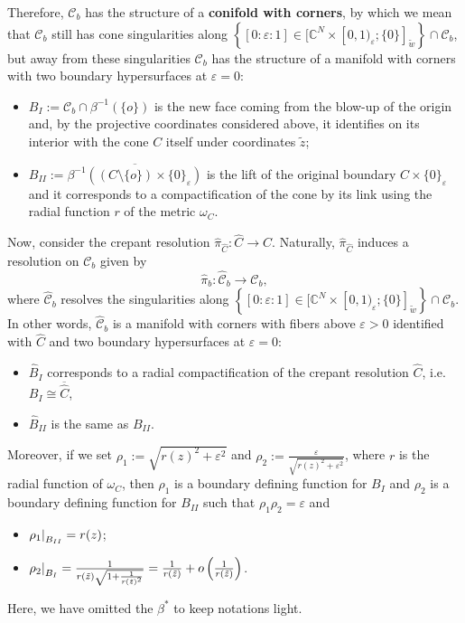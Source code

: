 \documentclass[a4paper,11pt]{article}
\def\C{\mathbb{C}}
\newcommand\restr[2]{{%
  \left.\kern-\nulldelimiterspace %
  #1 %
  \littletaller %
  \right|_{#2} %
  }}
\newcommand{\littletaller}{\mathchoice{\vphantom{\big|}}{}{}{}}
\begin{document}
Therefore, $\mathcal{C}_b$ has the structure of a \textbf{conifold with corners}, by which we mean that $\mathcal{C}_b$ still has cone singularities along $\left\{ [ 0 : \varepsilon :1] \in[\C^N \times [0,1)_\varepsilon ; \{0\}]_{\tilde w} \right\} \cap \mathcal{C}_b$, but away from these singularities $\mathcal{C}_b$ has the structure of a manifold with corners with two boundary hypersurfaces at $\varepsilon=0$: 
\begin{itemize}
    \item 
$B_I:= \mathcal{C}_b \cap \beta^{-1} ( \{ o\})$ is the new face coming from the blow-up of the origin and, by the projective coordinates considered above, it identifies on its interior with the cone $C$ itself under coordinates $\tilde z$;
\item $B_{II} := \overline{\beta^{-1}((C \setminus \{ o\}) \times \{ 0\}_\varepsilon)}$ is the lift of the original boundary $C \times \{ 0\}_\varepsilon$ and it corresponds to a compactification of the cone by its link using the radial function $r$ of the metric $\omega_C$.    
\end{itemize}
Now, consider the crepant resolution $\hat \pi_{\hat C} : \hat{C} \rightarrow C$. Naturally, $\hat \pi_{\hat C}$ induces a resolution on $\mathcal{C}_b$ given by
$$
\hat{\pi}_b : \hat{\mathcal{C}}_b \rightarrow \mathcal{C}_b,
$$
where $\hat{\mathcal{C}}_b$ resolves the singularities along $\left\{ [0 : \varepsilon :1] \in[\C^N \times [0,1)_\varepsilon ; \{0\}]_{\tilde w} \right\} \cap \mathcal{C}_b$. In other words, $\hat{\mathcal{C}}_b$ is a manifold with corners with fibers above $\varepsilon >0$ identified with $\hat{C}$ and two boundary hypersurfaces at $\varepsilon = 0 $:
\begin{itemize}
    \item 
$\hat{B}_I$ corresponds to a radial compactification of the crepant resolution $\hat{C}$, i.e. $B_I \cong \overline{\hat{C}}$,
\item $\hat{B}_{II}$ is the same as $B_{II}$. 
\end{itemize}
Moreover, if we set $\rho_1 := \sqrt{r(z)^2 + \varepsilon^2}$ and $\rho_2 := \frac{\varepsilon}{\sqrt{r(z)^2 + \varepsilon^2}}$, where $r$ is the radial function of $\omega_C$, then $\rho_1$ is a boundary defining function for $B_I$ and $\rho_2$ is a boundary defining function for $B_{II}$ such that $\rho_1 \rho_2 = \varepsilon$ and 
\begin{itemize}
    \item $\restr{\rho_1}{B_{II}} = r(z)$;
    \item $\restr{\rho_2}{B_I} = \frac{1}{ r(\tilde z) \sqrt{1 + \frac{1}{r(\tilde z)^2}}} = \frac{1}{r(\tilde z)} + o\left(\frac{1}{r(\tilde z)} \right)$.
\end{itemize}
Here, we have omitted the $\beta^{*}$ to keep notations light.\\
\end{document}
